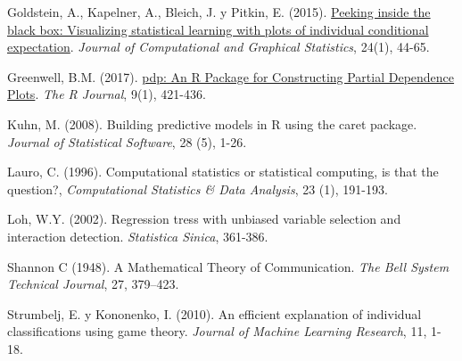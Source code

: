 \documentclass[]{book}
\theoremstyle{break}
\theoremstyle{definition}
\theoremstyle{definition}
\theoremstyle{definition}
\theoremstyle{remark}
\begin{document}
Goldstein, A., Kapelner, A., Bleich, J. y Pitkin, E. (2015).
\href{https://doi.org/10.1080/10618600.2014.907095}{Peeking inside the
black box: Visualizing statistical learning with plots of individual
conditional expectation}. \emph{Journal of Computational and Graphical
Statistics}, 24(1), 44-65.

Greenwell, B.M. (2017).
\href{https://journal.r-project.org/archive/2017/RJ-2017-016/index.html}{pdp:
An R Package for Constructing Partial Dependence Plots}. \emph{The R
Journal}, 9(1), 421-436.

Kuhn, M. (2008). Building predictive models in R using the caret
package. \emph{Journal of Statistical Software}, 28 (5), 1-26.

Lauro, C. (1996). Computational statistics or statistical computing, is
that the question?, \emph{Computational Statistics \& Data Analysis}, 23
(1), 191-193.

Loh, W.Y. (2002). Regression tress with unbiased variable selection and
interaction detection. \emph{Statistica Sinica}, 361-386.

Shannon C (1948). A Mathematical Theory of Communication. \emph{The Bell
System Technical Journal}, 27, 379--423.

Strumbelj, E. y Kononenko, I. (2010). An efficient explanation of
individual classifications using game theory. \emph{Journal of Machine
Learning Research}, 11, 1-18.


\end{document}
